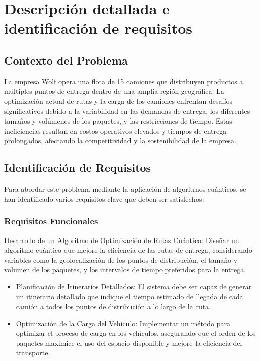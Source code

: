\chapter{Descripción detallada e identificación de requisitos}


\section{Contexto del Problema}

La empresa Wolf opera una flota de 15 camiones que distribuyen productos a múltiples puntos de entrega dentro de una amplia región geográfica. La optimización actual de rutas y la carga de los camiones enfrentan desafíos significativos debido a la variabilidad en las demandas de entrega, los diferentes tamaños y volúmenes de los paquetes, y las restricciones de tiempo. Estas ineficiencias resultan en costos operativos elevados y tiempos de entrega prolongados, afectando la competitividad y la sostenibilidad de la empresa.


\section{Identificación de Requisitos}
Para abordar este problema mediante la aplicación de algoritmos cuánticos, se han identificado varios requisitos clave que deben ser satisfechos:

\subsection{Requisitos Funcionales}
Desarrollo de un Algoritmo de Optimización de Rutas Cuántico: Diseñar un algoritmo cuántico que mejore la eficiencia de las rutas de entrega, considerando variables como la geolocalización de los puntos de distribución, el tamaño y volumen de los paquetes, y los intervalos de tiempo preferidos para la entrega.

\begin{itemize}
\item Planificación de Itinerarios Detallados: El sistema debe ser capaz de generar un itinerario detallado que indique el tiempo estimado de llegada de cada camión a todos los puntos de distribución a lo largo de la ruta.

\item Optimización de la Carga del Vehículo: Implementar un método para optimizar el proceso de carga en los vehículos, asegurando que el orden de los paquetes maximice el uso del espacio disponible y mejore la eficiencia del transporte.
\end{itemize}


